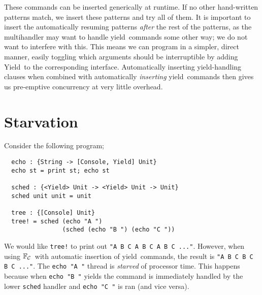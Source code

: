 \documentclass[msc,deptreport,cs]{infthesis} %
\newcommand{\code}[1]{\lstinline{#1}}
\newcommand\countingfrank{$\mathbb{F}_{\cal{C}}$}
\newcommand\yield{\textsf{yield}\xspace}
\newcommand\Yield{\textsf{Yield}\xspace}
\begin{document}



These commands can be inserted generically at runtime. If no other hand-written
patterns match, we insert these patterns and try all of them. It is important to
insert the automatically resuming patterns \emph{after} the rest of the
patterns, as the multihandler may want to handle \yield~commands some other way;
we do not want to interfere with this. This means we can program in a simpler,
direct manner, easily toggling which arguments should be interruptible by adding
\Yield~to the corresponding interface. Automatically inserting \yield-handling
clauses when combined with automatically \emph{inserting} \yield~commands then
gives us pre-emptive concurrency at very little overhead.

\section{Starvation}
\label{sec:starvation}

Consider the following program;

\begin{lstlisting}
  echo : {String -> [Console, Yield] Unit}
  echo st = print st; echo st

  sched : {<Yield> Unit -> <Yield> Unit -> Unit}
  sched unit unit = unit

  tree : {[Console] Unit}
  tree! = sched (echo "A ")
                (sched (echo "B ") (echo "C "))
\end{lstlisting}

We would like \code{tree!} to print out \code{"A B C A B C A B C ..."}. However,
when using \countingfrank~with automatic insertion of \yield~commands, the
result is \code{"A B C B C B C ..."}. The \code{echo "A "} thread is
\emph{starved} of processor time. This happens because when \code{echo "B "}
yields the command is immediately handled by the lower \code{sched} handler and
\code{echo "C "} is ran (and vice versa).
\end{document}

